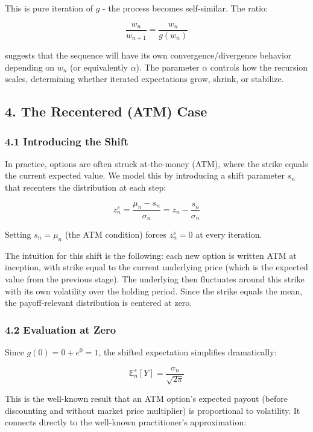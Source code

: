 \documentclass[
  11pt,
  openany]{article}
\begin{document}
This is pure iteration of \(g\) - the process becomes self-similar. The
ratio:

\[\frac{w_n}{w_{n+1}} = \frac{w_n}{g(w_n)}\]

suggests that the sequence will have its own convergence/divergence
behavior depending on \(w_n\) (or equivalently \(\alpha\)). The
parameter \(\alpha\) controls how the recursion scales, determining
whether iterated expectations grow, shrink, or stabilize.

\subsection{4. The Recentered (ATM) Case}\label{the-recentered-atm-case}

\subsubsection{4.1 Introducing the Shift}\label{introducing-the-shift}

In practice, options are often struck at-the-money (ATM), where the
strike equals the current expected value. We model this by introducing a
shift parameter \(s_n\) that recenters the distribution at each step:

\[z_n^s = \frac{\mu_n - s_n}{\sigma_n} = z_n - \frac{s_n}{\sigma_n}\]

Setting \(s_n = \mu_n\) (the ATM condition) forces \(z_n^s = 0\) at
every iteration.

The intuition for this shift is the following: each new option is
written ATM at inception, with strike equal to the current underlying
price (which is the expected value from the previous stage). The
underlying then fluctuates around this strike with its own volatility
over the holding period. Since the strike equals the mean, the
payoff-relevant distribution is centered at zero.

\subsubsection{4.2 Evaluation at Zero}\label{evaluation-at-zero}

Since \(g(0) = 0 + e^{0} = 1\), the shifted expectation simplifies
dramatically:

\[\mathbb{E}_n^s[Y] = \frac{\sigma_n}{\sqrt{2\pi}}\]

This is the well-known result that an ATM option's expected payout
(before discounting and without market price multiplier) is proportional
to volatility. It connects directly to the well-known practitioner's
approximation:
\end{document}
